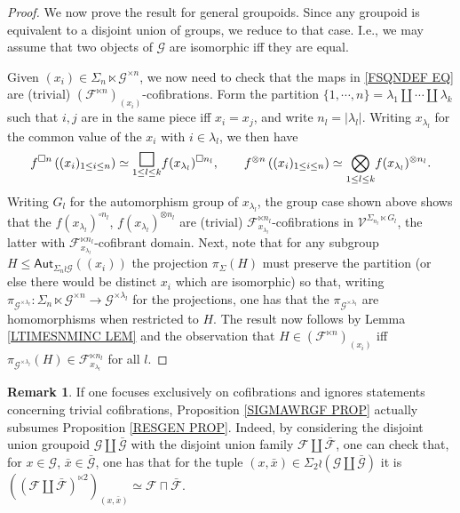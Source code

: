 \documentclass[a4paper,10pt
,draft
]{article}%
\numberwithin{equation}{section}
\numberwithin{figure}{section}
\theoremstyle{definition} %
\newtheorem{remark}[equation]{Remark}%
\newcommand{\F}{\ensuremath{\mathcal F}}
\newcommand{\V}{\ensuremath{\mathcal V}}
\newcommand{\G}{\ensuremath{\mathcal G}}
\newcommand{\1}{\ensuremath{\mathbbm 1}}%
\begin{document}
\begin{proof}
	
	We now prove the result for general groupoids.
	Since any groupoid is equivalent to a disjoint union of groups, 
	we reduce to that case. I.e., we may assume that two objects of $\G$ are isomorphic iff they are equal.
	
	Given $(x_i) \in \Sigma_n \ltimes \G^{\times n}$,
	we now need to check that the maps in \eqref{FSQNDEF EQ}
	are (trivial) $\left(\F^{\ltimes n}\right)_{(x_i)}$-cofibrations.
	Form the partition 
	$\{1,\cdots,n\} = \lambda_1 \amalg \cdots \amalg \lambda_k$
	such that $i,j$ are in the same piece iff $x_i=x_j$, and write
	$n_l = |\lambda_l|$.
	Writing $x_{\lambda_l}$ for the common value of the $x_i$ with $i\in \lambda_l$, we then have
	\[
	f^{\square n}\left((x_i)_{1\leq i \leq n }\right)
	\simeq
	\underset{1\leq l \leq k}{\mathlarger{\mathlarger{\mathlarger{\square}}}} f(x_{\lambda_l})^{\square n_l},
	\qquad
	f^{\otimes n}\left((x_i)_{1\leq i \leq n }\right)
	\simeq
	\underset{1\leq l \leq k}{\bigotimes} f(x_{\lambda_l})^{\otimes n_l}.
	\]
	Writing $G_l$ for the automorphism group of $x_{\lambda_l}$,
	the group case shown above shows that the
	$f(x_{\lambda_l})^{\square n_l}$,
	$f(x_{\lambda_l})^{\otimes n_l}$
	are (trivial) $\F_{x_{\lambda_l}}^{\ltimes n_l}$-cofibrations
	in $\V^{\Sigma_{n_l}\ltimes G_l}$,
	the latter with 
	$\F_{x_{\lambda_l}}^{\ltimes n_l}$-cofibrant domain.
	Next, note that for any subgroup
	$H \leq \mathsf{Aut}_{\Sigma_n \wr \G}((x_i))$ the projection 
	$\pi_{\Sigma}(H)$ must preserve the partition 
	(or else there would be distinct $x_i$ which are isomorphic) 
	so that, writing 
	$\pi_{\G^{\times \lambda_l}} \colon
	\Sigma_n \ltimes \G^{\times n} \to \G^{\times \lambda_l}$
	for the projections,
	one has that the 
	$\pi_{\G^{\times \lambda_l}}$ are homomorphisms when restricted to $H$. The result now follows by Lemma \ref{LTIMESNMINC LEM}
	and the observation that
	$H \in \left(\F^{\ltimes n}\right)_{(x_i)}$
	iff
	$\pi_{\G^{\times \lambda_l}}(H) \in \F_{x_{\lambda_l}}^{\ltimes n_l}$
	for all $l$.
\end{proof}


\begin{remark}
	If one focuses exclusively on cofibrations and ignores statements concerning trivial cofibrations,
	Proposition \ref{SIGMAWRGF PROP} actually subsumes Proposition \ref{RESGEN PROP}. 
	Indeed, by considering the disjoint union groupoid 
	$\G \amalg \bar{\G}$
	with the disjoint union family 
	$\F \amalg \bar{\F}$,
	one can check that, for
	$x \in \G$, $\bar{x} \in \bar{\G}$,
	one has that for the tuple $(x,\bar{x}) \in \Sigma_2 \wr (\G \amalg \bar{\G})$
	it is
	$\left(\left(\F \amalg \bar{\F}\right)^{\ltimes 2}\right)_{(x,\bar{x})} \simeq \F \sqcap \bar{\F}$.
\end{remark}
\end{document}
